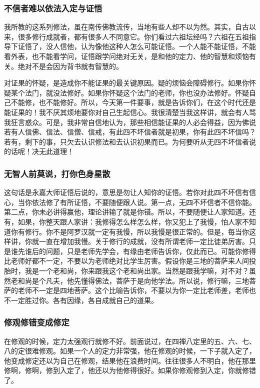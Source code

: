 \documentclass{book}
\begin{document}
\subsubsection{不信者难以依法入定与证悟}

我所教的这系列修法，虽在南传佛教流传，当地有些人却不以为然。其实，自古以来，很多修行成就者，都有很多人不同意它。你们看过六祖坛经吗？六祖在五祖指导下证悟了，没人信他，认为像他这种人怎么可能证悟。一个人能不能证悟，不能看外表，也不能看学问，证悟跟学问绝对无关，是和他的定力、他的智慧和烦恼有关。绝对不是会因为背书就有智慧的。

对证果的怀疑，是造成你不能证果的最关键原因。疑的烦恼会障碍修行。如果你怀疑某个法门，就没法修好。如果你怀疑这个法门的老师，你也没办法修好。怀疑自己不能修，也不能修好。所以，今天第一件要事，就是告诉你们，在这个时代还是能证果的！我不厌其烦地要你对自己生起信心。我很清楚当我这样讲，就会有人骂我狂言惑众。可是，我非常自信地认为，那些相信能证果的人必会得益，因为佛说若有人信佛、信法、信僧、信戒，有此四不坏信者就是初果，你有此四不坏信吗？若有，剩下的事，只欠去认识修法和去认识初果而已。为何要听从无四不坏信者说的话呢！决无此道理！

\subsubsection{无智人前莫说，打你色身星散}

这句话是永嘉大师证悟后说的，意思是勿让人知你的证悟。若你对此四不坏信有信心，当你依法修了有所证悟，不要随便跟人说。第一点，无四不坏信者不信你能。第二点，你未必讲得赢他，理论讲输了就是你错。所以，不要随便让人家知道。还有，如果，你整天跟人家讲：我修得怎么样怎么样，你又犯上了我慢，怕人家不知道你有修行。你不是阿罗汉就一定有我慢，所以我慢是很正常的。但是，每当你这样讲，你就一直在增加我慢。关于修行的成就，没有所谓老师一定比徒弟厉害。只是谁先谁后的问题，只是老师先学会，有缘由老师告诉你，仅此而已。可能你修得比老师好都不一定，不要以为老师绝对比学生厉害。假设你是三地的菩萨来人间投胎时，我是一个老和尚，你来跟我这个老和尚出家。当然是跟我学嘛，对不对？虽然老和尚是个凡夫，他先懂得佛法，菩萨于是向他学法。所以说，修行嘛，三地菩萨的老师不一定是四地菩萨。这个比喻告诉你，不要以为你一定比老师差，老师也不一定胜过你。各有因缘，各自成就自己的道果。

\subsubsection{修观修错变成修定}

在修观的时候，定力太强观行就修不好。前面说过，在四禅八定里的五、六、七、八的定很难修观。如果一个人的定力非常强，他在修观的时候，一下子就入定了，他变成修定还以为自己在修观，结果他在浪费时间。往往很多人不明白，他在那里修啊，修啊，修到入定了，他还以为他修得很好。如果你修观修到入定，你就修错了。
\end{document}
